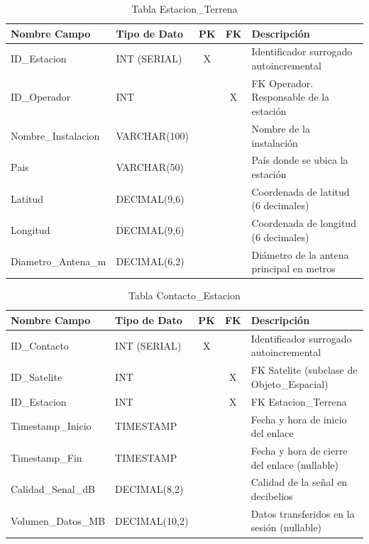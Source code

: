 \begin{table}[H]
\centering
\footnotesize
\begin{tabular}{|l|l|c|c|p{5cm}|}
\hline
\textbf{Nombre Campo} & \textbf{Tipo de Dato} & \textbf{PK} & \textbf{FK} & \textbf{Descripción} \\
\hline
ID\_Estacion & INT (SERIAL) & X & & Identificador surrogado autoincremental \\
\hline
ID\_Operador & INT & & X & FK Operador. Responsable de la estación \\
\hline
Nombre\_Instalacion & VARCHAR(100) & & & Nombre de la instalación \\
\hline
Pais & VARCHAR(50) & & & País donde se ubica la estación \\
\hline
Latitud & DECIMAL(9,6) & & & Coordenada de latitud (6 decimales) \\
\hline
Longitud & DECIMAL(9,6) & & & Coordenada de longitud (6 decimales) \\
\hline
Diametro\_Antena\_m & DECIMAL(6,2) & & & Diámetro de la antena principal en metros \\
\hline
\end{tabular}
\caption{Tabla Estacion\_Terrena}
\end{table}

\begin{table}[H]
\centering
\footnotesize
\begin{tabular}{|l|l|c|c|p{5cm}|}
\hline
\textbf{Nombre Campo} & \textbf{Tipo de Dato} & \textbf{PK} & \textbf{FK} & \textbf{Descripción} \\
\hline
ID\_Contacto & INT (SERIAL) & X & & Identificador surrogado autoincremental \\
\hline
ID\_Satelite & INT & & X & FK Satelite (subclase de Objeto\_Espacial) \\
\hline
ID\_Estacion & INT & & X & FK Estacion\_Terrena \\
\hline
Timestamp\_Inicio & TIMESTAMP & & & Fecha y hora de inicio del enlace \\
\hline
Timestamp\_Fin & TIMESTAMP & & & Fecha y hora de cierre del enlace (nullable) \\
\hline
Calidad\_Senal\_dB & DECIMAL(8,2) & & & Calidad de la señal en decibelios \\
\hline
Volumen\_Datos\_MB & DECIMAL(10,2) & & & Datos transferidos en la sesión (nullable) \\
\hline
\end{tabular}
\caption{Tabla Contacto\_Estacion}
\end{table}


